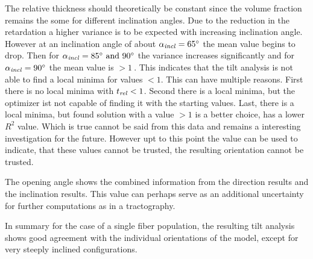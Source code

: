 \par
%
The relative thickness \trel{} should theoretically be constant since the volume fraction remains the some for different inclination angles.
Due to the reduction in the retardation a higher variance is to be expected with increasing inclination angle.
However at an inclination angle of about $\textnormal{$\alpha_{\mathit{incl}}$}=\SI{65}{\degree}$ the mean value begins to drop.
Then for $\modelInc=\SIlist{85;90}{\degree}$ the variance increases significantly and for $\textnormal{$\alpha_{\mathit{incl}}$}=\SI{90}{\degree}$ the mean value is $>\SI{1}{}$.
This indicates that the tilt analysis is not able to find a local minima for \trel{} values $<1$.
This can have multiple reasons.
First there is no local minima with $\textnormal{$t_\mathit{rel}$}<1$.
Second there is a local minima, but the optimizer ist not capable of finding it with the starting values.
Last, there is a local minima, but found solution with a \trel{} value $>1$ is a better choice, \ie{} has a lower $R^2$ value.
Which is true cannot be said from this data and remains a interesting investigation for the future.
However upt to this point the \trel{} value can be used to indicate, that these values cannot be trusted, \ie{} the resulting orientation cannot be trusted.
\par
%
The opening angle shows the combined information from the direction results and the inclination results.
This value can perhaps serve as an additional uncertainty for further computations as in a tractography.
\par
%
In summary for the case of a single fiber population, the resulting tilt analysis shows good agreement with the individual orientations of the model, except for very steeply inclined configurations.
%
% 
% 
